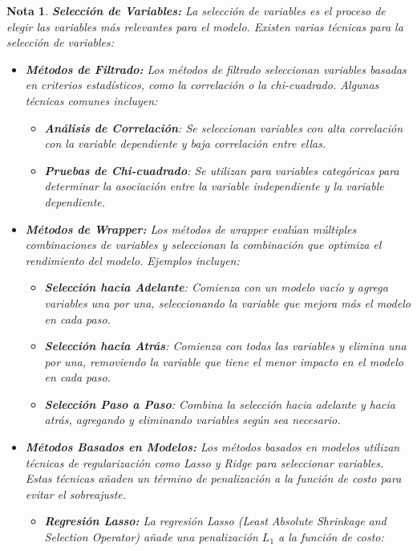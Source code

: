 \documentclass[12pt]{article}
\newtheorem{Note}{Nota}%
\begin{document}
\begin{Note} \textbf{Selecci\'on de Variables:} La selecci\'on de variables es el proceso de elegir las variables m\'as relevantes para el modelo. Existen varias t\'ecnicas para la selecci\'on de variables:
\begin{itemize}
\item \textbf{M\'etodos de Filtrado:}  Los m\'etodos de filtrado seleccionan variables basadas en criterios estad\'isticos, como la correlaci\'on o la chi-cuadrado. Algunas t\'ecnicas comunes incluyen:
\begin{itemize}
    \item \textbf{An\'alisis de Correlaci\'on}: Se seleccionan variables con alta correlaci\'on con la variable dependiente y baja correlaci\'on entre ellas.
    \item \textbf{Pruebas de Chi-cuadrado}: Se utilizan para variables categ\'oricas para determinar la asociaci\'on entre la variable independiente y la variable dependiente.
\end{itemize}

\item \textbf{M\'etodos de Wrapper:} Los m\'etodos de wrapper eval\'uan m\'ultiples combinaciones de variables y seleccionan la combinaci\'on que optimiza el rendimiento del modelo. Ejemplos incluyen:
\begin{itemize}
    \item \textbf{Selecci\'on hacia Adelante}: Comienza con un modelo vac\'io y agrega variables una por una, seleccionando la variable que mejora m\'as el modelo en cada paso.
    \item \textbf{Selecci\'on hacia Atr\'as}: Comienza con todas las variables y elimina una por una, removiendo la variable que tiene el menor impacto en el modelo en cada paso.
    \item \textbf{Selecci\'on Paso a Paso}: Combina la selecci\'on hacia adelante y hacia atr\'as, agregando y eliminando variables seg\'un sea necesario.
\end{itemize}

\item \textbf{M\'etodos Basados en Modelos:} Los m\'etodos basados en modelos utilizan t\'ecnicas de regularizaci\'on como Lasso y Ridge para seleccionar variables. Estas t\'ecnicas a\~naden un t\'ermino de penalizaci\'on a la funci\'on de costo para evitar el sobreajuste.

\begin{itemize}

\item \textbf{Regresi\'on Lasso:} La regresi\'on Lasso (Least Absolute Shrinkage and Selection Operator) a\~nade una penalizaci\'on $L_1$ a la funci\'on de costo:


\end{itemize}
\end{itemize}
\end{Note}
\end{document}
